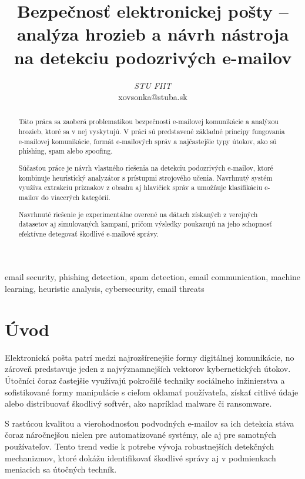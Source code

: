 \documentclass[conference]{IEEEtran}
\begin{document}
\title{Bezpečnosť elektronickej pošty – analýza hrozieb a návrh nástroja na detekciu podozrivých e-mailov\\
}
\author{
\textit{STU FIIT}\\
xovsonka@stuba.sk}


\maketitle

\begin{abstract}
Táto práca sa zaoberá problematikou bezpečnosti e-mailovej komunikácie a analýzou hrozieb, ktoré sa v nej vyskytujú. V práci sú predstavené základné princípy fungovania e-mailovej komunikácie, formát e-mailových správ a najčastejšie typy útokov, ako sú phishing, spam alebo spoofing.

Súčasťou práce je návrh vlastného riešenia na detekciu podozrivých e-mailov, ktoré kombinuje heuristický analyzátor s prístupmi strojového učenia. Navrhnutý systém využíva extrakciu príznakov z obsahu aj hlavičiek správ a umožňuje klasifikáciu e-mailov do viacerých kategórií.

Navrhnuté riešenie je experimentálne overené na dátach získaných z verejných datasetov aj simulovaných kampaní, pričom výsledky poukazujú na jeho schopnosť efektívne detegovať škodlivé e-mailové správy.
\end{abstract}

\begin{IEEEkeywords}
email security, phishing detection, spam detection, email communication, machine learning, heuristic analysis, cybersecurity, email threats
\end{IEEEkeywords}

\section{Úvod}

Elektronická pošta patrí medzi najrozšírenejšie formy digitálnej komunikácie, no zároveň predstavuje jeden z najvýznamnejších vektorov kybernetických útokov. Útočníci čoraz častejšie využívajú pokročilé techniky sociálneho inžinierstva a sofistikované formy manipulácie s cieľom oklamať používateľa, získať citlivé údaje alebo distribuovať škodlivý softvér, ako napríklad malware či ransomware.

S rastúcou kvalitou a vierohodnosťou podvodných e-mailov sa ich detekcia stáva čoraz náročnejšou nielen pre automatizované systémy, ale aj pre samotných používateľov. Tento trend vedie k potrebe vývoja robustnejších detekčných mechanizmov, ktoré dokážu identifikovať škodlivé správy aj v podmienkach meniacich sa útočných techník.
\end{document}
